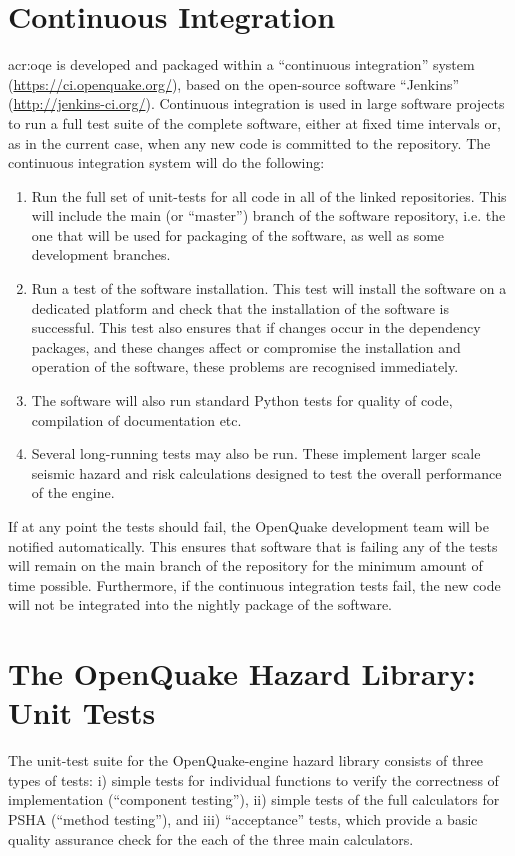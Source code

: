 \section{Continuous Integration}
\gls{acr:oqe} is developed and packaged within a ``continuous integration'' 
system (\href{https://ci.openquake.org/}{https://ci.openquake.org/}),
based on the open-source software ``Jenkins'' 
(\href{http://jenkins-ci.org/}{http://jenkins-ci.org/}). 
% 
Continuous integration is used in large software projects to run a 
full test suite of the complete software, either at fixed time 
intervals or, as in the current case, when any new code is committed
to the repository. The continuous integration system will do the 
following:
% 
\begin{enumerate}
\item Run the full set of unit-tests for all code in all of the linked 
    repositories. This will include the main (or ``master'') branch of 
    the software repository, i.e. the one that will be used for 
    packaging of the software, as well as some development branches.
\item Run a test of the software installation. This test will install 
    the software on a dedicated platform and check that the installation 
    of the software is successful. This test also ensures that if changes
    occur in the dependency packages, and these changes affect or 
    compromise the installation and operation of the software, these
    problems are recognised immediately.
\item The software will also run standard Python tests for quality of 
    code, compilation of documentation etc.
\item Several long-running tests may also be run. These implement larger 
    scale seismic hazard and risk calculations designed to test the 
    overall performance of the engine. 
\end{enumerate}
%
If at any point the tests should fail, the OpenQuake development team 
will be notified automatically. 
This ensures that software that is failing any of the tests will 
remain on the main branch of the repository for the minimum amount of 
time possible. 
Furthermore, if the continuous integration tests fail, the new code 
will not be integrated into the nightly package of the software. 
%
\section{The OpenQuake Hazard Library: Unit Tests}
The unit-test suite for the OpenQuake-engine hazard library consists of three 
types of tests: i) simple tests for individual functions to verify the
correctness of implementation (``component testing''), ii) simple tests
of the full calculators for PSHA (``method testing''), and iii) 
``acceptance'' tests, which provide a basic quality assurance check 
for the each of the three main calculators. 
%

